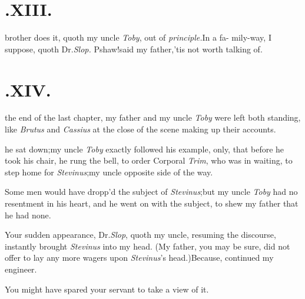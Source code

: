 \documentclass{article}
\begin{document}
\null
\section{.\enspace  XIII.}

 brother does it, quoth my uncle
\textit{Toby}, out of \textit{principle.}\tsh In a fa-\break
mily-way, I suppose, quoth Dr.\@ \textit{Slop.}\tsh\break
Pshaw!\tsk said my father,\tsk ’tis not worth\break
talking of.

\null
\section{.\enspace  XIV.}

 the end of the last chapter, my\break
father and my uncle \textit{Toby} were\break
left both standing, like \textit{Brutus} and \textit{Cassius}\break
at the close of the scene making up their\break
accounts.

\break
\tsk he sat down;\tsk my uncle \textit{Toby}
exactly followed his example, only, that before he took his chair, he rung the bell,
to order Corporal \textit{Trim}, who was in waiting, to step home for
\textit{Stevinus};\tsk my uncle 
opposite side of the way.

Some men would have dropp’d the subject of
\textit{Stevinus};\tsk but my uncle \textit{Toby} had no resentment
in his heart, and he went on with the subject, to shew my father
that he had none.

Your sudden appearance, Dr.\@ \textit{Slop},\break
quoth my uncle,
resuming the discourse, instantly brought \textit{Stevinus} into my
head. (My father, you may be sure, did not offer to lay any more
wagers upon \textit{Ste\-vinus}’s head.)\tsh Because, continued my
engineer.

You might have spared your servant
to take a view of it.
\end{document}
